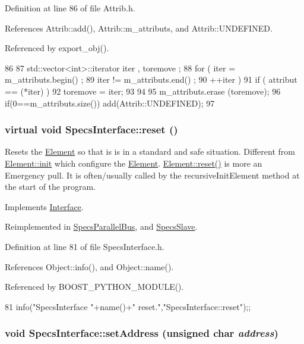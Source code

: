 Definition at line 86 of file Attrib.h.

References Attrib::add(), Attrib::m\_\-attributs, and Attrib::UNDEFINED.

Referenced by export\_\-obj().


\begin{DoxyCode}
86                                {
87     std::vector<int>::iterator iter , toremove ;
88     for ( iter  = m_attributs.begin() ;
89           iter != m_attributs.end()   ;
90           ++iter ) {
91       if ( attribut == (*iter) ) {
92         toremove = iter;
93       }
94     }
95     m_attributs.erase (toremove);
96     if(0==m_attributs.size()) add(Attrib::UNDEFINED);
97   }
\end{DoxyCode}
\hypertarget{classSpecsInterface_ade474eeef32f10c72926c9ba7d23f9a8}{
\subsubsection[{reset}]{\setlength{\rightskip}{0pt plus 5cm}virtual void SpecsInterface::reset ()}}
\label{classSpecsInterface_ade474eeef32f10c72926c9ba7d23f9a8}
Resets the \hyperlink{classElement}{Element} so that is is in a standard and safe situation. Different from \hyperlink{classElement_af42754b5cabc198869222725218d695c}{Element::init} which configure the \hyperlink{classElement}{Element}. \hyperlink{classElement_a69efffa22f06909d768149715565cb56}{Element::reset()} is more an Emergency pull. It is often/usually called by the recursiveInitElement method at the start of the program. 

Implements \hyperlink{classInterface_a4d44329cea9981a9e0392eaaf99efadd}{Interface}.

Reimplemented in \hyperlink{classSpecsParallelBus_af8e41f6efecc8d65cf7d7a884a33d4ee}{SpecsParallelBus}, and \hyperlink{classSpecsSlave_a6c69baff5941cabed2947f547041bbeb}{SpecsSlave}.

Definition at line 81 of file SpecsInterface.h.

References Object::info(), and Object::name().

Referenced by BOOST\_\-PYTHON\_\-MODULE().


\begin{DoxyCode}
81 { info("SpecsInterface "+name()+" reset.","SpecsInterface::reset");};
\end{DoxyCode}
\hypertarget{classSpecsInterface_aa92dff67cc80487ee3109b6aee2fa007}{
\subsubsection[{setAddress}]{\setlength{\rightskip}{0pt plus 5cm}void SpecsInterface::setAddress (unsigned char {\em address})}}
\label{classSpecsInterface_aa92dff67cc80487ee3109b6aee2fa007}


